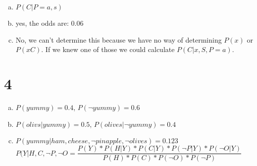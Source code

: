 \documentclass{article}
\begin{document}
    \begin{enumerate}[a)]
      
        \item $P(C|P=a,s)$
        \item yes, the odds are: 0.06
        \item No, we can't determine this because we have no way of determining $P(x)$ or $P(xC)$. If we knew one of those we could calculate $P(C|x,S,P=a)$.
            
    \end{enumerate}

    \section{4}

    \begin{enumerate}[a)]
      
        \item $P(yummy) = 0.4$, $P(\neg yummy) = 0.6$
        \item $P(olivs|yummy) = 0.5 $, $P(olives|\neg yummy) = 0.4$
        \item $P(yummy | ham, cheese, \neg pinapple, \neg olives) = 0.123$ \\
            $P(Y|H, C, \neg P, \neg O = \dfrac{P(Y)*P(H|Y)*P(C|Y)*P(\neg P|Y) * P(\neg O|Y)}
            {P(H)*P(C)*P(\neg O)*P(\neg P)}$ 
            
    \end{enumerate}
\end{document}
